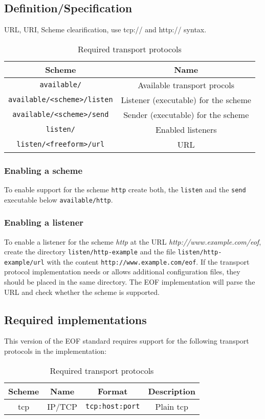 \subsection{Definition/Specification}
URL, URI, Scheme clearification, use tcp:// and http:// syntax.


\begin{longtable}{|c|c|}
\caption{Required transport protocols}\\
\hline
\textbf{Scheme} & \textbf{Name}\\
\hline
\verb=available/= & Available transport procols\\
\hline
\verb=available/<scheme>/listen= & Listener (executable) for the scheme\\
\hline
\verb=available/<scheme>/send= & Sender (executable) for the scheme\\
\hline
\verb=listen/= & Enabled listeners\\
\hline
\verb=listen/<freeform>/url= & URL \\
\hline
\end{longtable}
\subsubsection{Enabling a scheme}
\label{tpscheme}
To enable support for the scheme \verb=http=
create both, the \verb=listen= and the \verb=send= executable below
\verb=available/http=.
\subsubsection{Enabling a listener}
\label{tplisten}
To enable a listener for the scheme \emph{http} at the URL
\emph{http://www.example.com/eof}, create
the directory \verb=listen/http-example= and the file
\verb=listen/http-example/url= with the content
\verb=http://www.example.com/eof=.
If the transport protocol implementation needs or allows additional
configuration files, they should be placed in the same directory.
The EOF implementation will parse the URL and check whether the
scheme is supported.
\subsection{Required implementations}
\label{tprequired}
This version of the EOF standard requires support for the following
transport protocols in the implementation:
\begin{longtable}{|c|c|c|c|}
\caption{Required transport protocols}\\
\hline
\textbf{Scheme} & \textbf{Name} & \textbf{Format} & \textbf{Description}\\
\hline
tcp & IP/TCP & \verb=tcp:host:port= & Plain tcp\\
\hline
\end{longtable}
